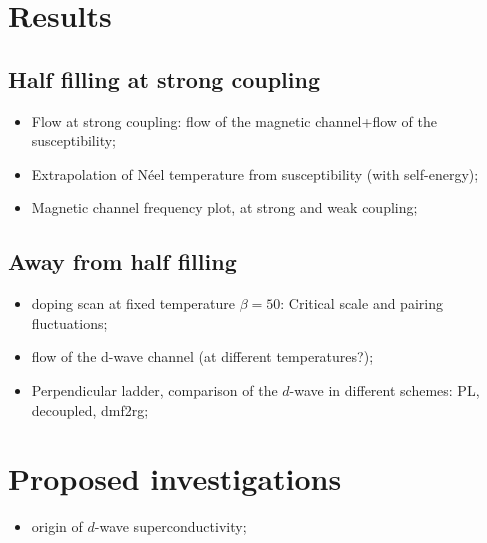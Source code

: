 \documentclass[paper=a4, fontsize=11pt]{scrartcl} %
\numberwithin{equation}{section} %
\numberwithin{figure}{section} %
\numberwithin{table}{section} %
\begin{document}
\section{Results}
\subsection{Half filling at strong coupling} 
\begin{itemize}
\item Flow at strong coupling: flow of the magnetic channel+flow of the susceptibility; 
\item Extrapolation of N\' eel temperature from susceptibility (with self-energy);
\item Magnetic channel frequency plot, at strong and weak coupling; 
\end{itemize} 
\subsection{Away from half filling}
\begin{itemize}
\item doping scan at fixed temperature $\beta=50$: Critical scale and pairing fluctuations; 
\item flow of the d-wave channel (at different temperatures?); 
\item Perpendicular ladder, comparison of the $d$-wave in different schemes: PL, decoupled, dmf2rg; 
\end{itemize}  

\section{Proposed investigations} 
\begin{itemize}
\item origin of $d$-wave superconductivity;  
\end{itemize} 
\newpage
\end{document}
